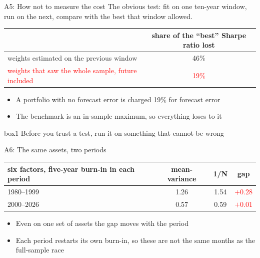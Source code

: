 \documentclass[aspectratio=169,10pt]{beamer}
\begin{document}
\begin{frame}{A5: How not to measure the cost}
The obvious test: fit on one ten-year window, run on the next, compare with the best that window allowed.
\vskip 8pt
\begin{center}
\renewcommand{\arraystretch}{1.3}
\begin{tabular}{lc}
\toprule
 & share of the ``best'' Sharpe ratio lost \\
\midrule
weights estimated on the previous window & 46\% \\
\textcolor{red}{weights that saw the whole sample, future included} & \textcolor{red}{19\%} \\
\bottomrule
\end{tabular}
\end{center}
\vskip 8pt
\begin{itemize}
\item A portfolio with no forecast error is charged 19\% for forecast error
\vskip 5pt
\item The benchmark is an in-sample maximum, so everything loses to it
\end{itemize}
\vskip 8pt
\begin{beamercolorbox}[rounded=true,sep=7pt,center]{box1}
Before you trust a test, run it on something that cannot be wrong
\end{beamercolorbox}
\end{frame}

\begin{frame}{A6: The same assets, two periods}
\vskip 4pt
\begin{center}
\renewcommand{\arraystretch}{1.4}
\begin{tabular}{lccc}
\toprule
six factors, five-year burn-in in each period & mean-variance & 1/N & gap \\
\midrule
1980--1999 & 1.26 & 1.54 & \textcolor{red}{$+0.28$} \\
2000--2026 & 0.57 & 0.59 & \textcolor{red}{$+0.01$} \\
\bottomrule
\end{tabular}
\end{center}
\vskip 12pt
\begin{itemize}
\item Even on one set of assets the gap moves with the period
\vskip 8pt
\item Each period restarts its own burn-in, so these are not the same months as the full-sample race
\end{itemize}
\end{frame}
\end{document}
